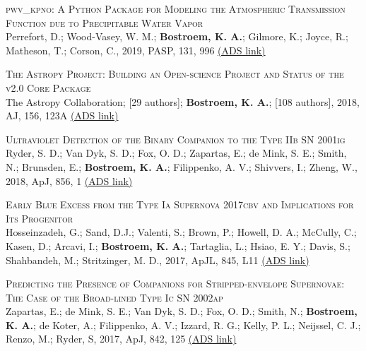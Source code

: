 \begin{revnumerate}[14]
\item{\textsc{pwv\_kpno: A Python Package for Modeling the Atmospheric Transmission Function due to Precipitable Water Vapor}\\ 
Perrefort, D.; Wood-Vasey, W. M.; {\bf Bostroem, K. A.}; Gilmore, K.; Joyce, R.; Matheson, T.; Corson, C., 2019, PASP, 131, 996 
\color{blue}\href{https://ui.adsabs.harvard.edu/#abs/2019PASP..131b5002P/abstract}{(ADS link)}\color{black}}\\

\item{\textsc{The Astropy Project: Building an Open-science Project and Status of the v2.0 Core Package}\\ 
The Astropy Collaboration; [29 authors]; {\bf Bostroem, K. A.}; [108 authors], 2018, AJ, 156, 123A
\color{blue}\href{https://ui.adsabs.harvard.edu/#abs/2018AJ....156..123A/abstract}{(ADS link)}\color{black}}\\

\item{\textsc{Ultraviolet Detection of the Binary Companion to the Type IIb SN 2001ig}\\ 
Ryder, S. D.; Van Dyk, S. D.; Fox, O. D.; Zapartas, E.; de Mink, S. E.; Smith, N.; Brunsden, E.; {\bf Bostroem, K. A.}; Filippenko, A. V.; Shivvers, I.; Zheng, W., 2018, ApJ, 856, 1
\color{blue}\href{https://ui.adsabs.harvard.edu/#abs/2018ApJ...856...83R/abstract}{(ADS link)}\color{black}}\\

\item{\textsc{Early Blue Excess from the Type Ia Supernova 2017cbv and Implications for Its Progenitor}\\ 
Hosseinzadeh, G.; Sand, D.J.; Valenti, S.; Brown, P.; Howell, D. A.; McCully, C.; Kasen, D.; Arcavi, I.; {\bf Bostroem, K. A.}; Tartaglia, L.; Hsiao, E. Y.; Davis, S.; Shahbandeh, M.; Stritzinger, M. D., 2017, ApJL, 845, L11
\color{blue}\href{https://ui.adsabs.harvard.edu/#abs/2017ApJ...845L..11H/abstract}{(ADS link)}\color{black}}\\ %

\item{\textsc{Predicting the Presence of Companions for Stripped-envelope Supernovae: The Case of the Broad-lined Type Ic SN 2002ap}\\ 
Zapartas, E.; de Mink, S. E.; Van Dyk, S. D.; Fox, O. D.; Smith, N.; {\bf Bostroem, K. A.}; de Koter, A.; Filippenko, A. V.; Izzard, R. G.; Kelly, P. L.; Neijssel, C. J.; Renzo, M.; Ryder, S, 2017, ApJ, 842, 125
\color{blue}\href{https://ui.adsabs.harvard.edu/#abs/2017ApJ...842..125Z/abstract}{(ADS link)}\color{black}}\\ %


\end{revnumerate}
